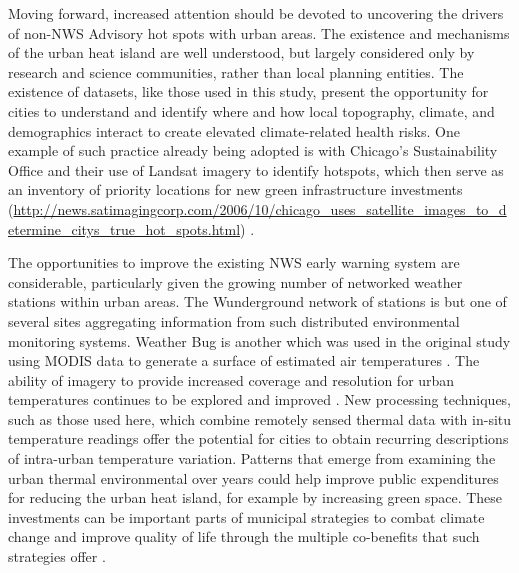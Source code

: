 \documentclass{ametsoc}
\begin{document}
Moving forward, increased attention should be devoted to uncovering the drivers of non-NWS Advisory hot spots with urban areas. The existence and mechanisms of the urban heat island are well understood, but largely considered only by research and science communities, rather than local planning entities. The existence of datasets, like those used in this study, present the opportunity for cities to understand and identify where and how local topography, climate, and demographics interact to create elevated climate-related health risks.  One example of such practice already being adopted is with Chicago's Sustainability Office and their use of Landsat imagery to identify hotspots, which then serve as an inventory of priority locations for new green infrastructure investments (\url{http://news.satimagingcorp.com/2006/10/chicago_uses_satellite_images_to_determine_citys_true_hot_spots.html}) \citep{chicago} . 

The opportunities to improve the existing NWS early warning system are considerable, particularly given the growing number of networked weather stations within urban areas. The Wunderground network of stations is but one of several sites aggregating information from such distributed environmental monitoring systems. Weather Bug is another which was used in the original study using MODIS data to generate a surface of estimated air temperatures \citep{kloog2012}. The ability of imagery to provide increased coverage and resolution for urban temperatures continues to be explored and improved \citep{voogt2003}. New processing techniques, such as those used here, which combine remotely sensed thermal data with in-situ temperature readings offer the potential for cities to obtain recurring descriptions of intra-urban temperature variation. Patterns that emerge from examining the urban thermal environmental over years could help improve public expenditures for reducing the urban heat island, for example by increasing green space. These investments can be important parts of municipal strategies to combat climate change and improve quality of life through the multiple co-benefits that such strategies offer \citep{patz2008}. 
\end{document}
